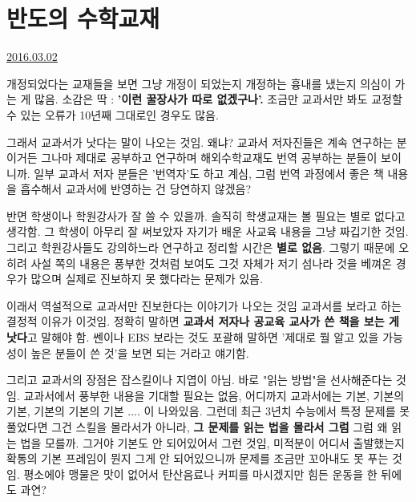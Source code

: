 \section{반도의 수학교재}
\href{https://www.kockoc.com/Apoc/659705}{2016.03.02}

\vspace{5mm}

개정되었다는 교재들을 보면 그냥 개정이 되었는지 개정하는 흉내를 냈는지 의심이 가는 게 많음.
소감은 딱 : \textbf{'이런 꿀장사가 따로 없겠구나'.}
조금만 교과서만 봐도 교정할 수 있는 오류가 10년째 그대로인 경우도 많음.
\vspace{5mm}

그래서 교과서가 낫다는 말이 나오는 것임.
왜냐? 교과서 저자진들은 계속 연구하는 분이거든
그나마 제대로 공부하고 연구하며 해외수학교재도 번역 공부하는 분들이 보이니까.
일부 교과서 저자 분들은 '번역자'도 하고 계심, 그럼 번역 과정에서 좋은 책 내용을 흡수해서 교과서에 반영하는 건 당연하지 않겠음?
\vspace{5mm}

반면 학생이나 학원강사가 잘 쓸 수 있을까.
솔직히 학생교재는 볼 필요는 별로 없다고 생각함. 그 학생이 아무리 잘 써보았자 자기가 배운 사교육 내용을 그냥 짜깁기한 것임.
그리고 학원강사들도 강의하느라 연구하고 정리할 시간은 \textbf{별로 없음}.
그렇기 때문에 오히려 사설 쪽의 내용은 풍부한 것처럼 보여도 그것 자체가 저기 섬나라 것을 베껴온 경우가 많으며
실제로 진보하지 못 했다라는 문제가 있음.
\vspace{5mm}

이래서 역설적으로 교과서만 진보한다는 이야기가 나오는 것임
교과서를 보라고 하는 결정적 이유가 이것임. 정확히 말하면 \textbf{교과서 저자나 공교육 교사가 쓴 책을 보는 게 낫다}고 말해야 함.
쎈이나 EBS 보라는 것도 포괄해 말하면 '제대로 뭘 알고 있을 가능성이 높은 분들이 쓴 것'을 보면 되는 거라고 얘기함.
\vspace{5mm}

그리고 교과서의 장점은 잡스킬이나 지엽이 아님. 바로 "읽는 방법"을 선사해준다는 것임.
교과서에서 풍부한 내용을 기대할 필요는 없음, 어디까지 교과서에는 기본, 기본의 기본, 기본의 기본의 기본 .... 이 나와있음.
그런데 최근 3년치 수능에서 특정 문제를 못 풀었다면 그건 스킬을 몰라서가 아니라, \textbf{그 문제를 읽는 법을 몰라서 그럼}
그럼 왜 읽는 법을 모를까. 그거야 기본도 안 되어있어서 그런 것임,
미적분이 어디서 출발했는지 확통의 기본 프레임이 뭔지 그게 안 되어있으니까 문제를 조금만 꼬아내도 못 푸는 것임.
평소에야 맹물은 맛이 없어서 탄산음료나 커피를 마시겠지만 힘든 운동을 한 뒤에도 과연?
\vspace{5mm}

